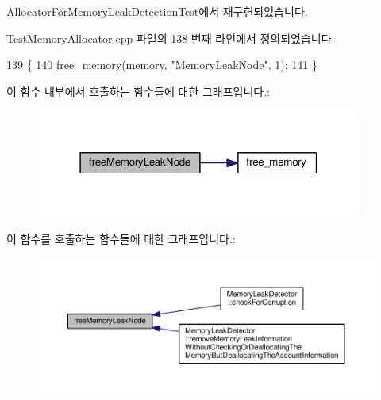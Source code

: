 \hyperlink{class_allocator_for_memory_leak_detection_test_a10f2958f3b7378256e933896ccc93df0}{Allocator\+For\+Memory\+Leak\+Detection\+Test}에서 재구현되었습니다.



Test\+Memory\+Allocator.\+cpp 파일의 138 번째 라인에서 정의되었습니다.


\begin{DoxyCode}
139 \{
140     \hyperlink{class_test_memory_allocator_a529ac9813d3b0836ce0b964449942534}{free\_memory}(memory, \textcolor{stringliteral}{"MemoryLeakNode"}, 1);
141 \}
\end{DoxyCode}


이 함수 내부에서 호출하는 함수들에 대한 그래프입니다.\+:
\nopagebreak
\begin{figure}[H]
\begin{center}
\leavevmode
\includegraphics[width=303pt]{class_test_memory_allocator_a10f2958f3b7378256e933896ccc93df0_cgraph}
\end{center}
\end{figure}




이 함수를 호출하는 함수들에 대한 그래프입니다.\+:
\nopagebreak
\begin{figure}[H]
\begin{center}
\leavevmode
\includegraphics[width=350pt]{class_test_memory_allocator_a10f2958f3b7378256e933896ccc93df0_icgraph}
\end{center}
\end{figure}



